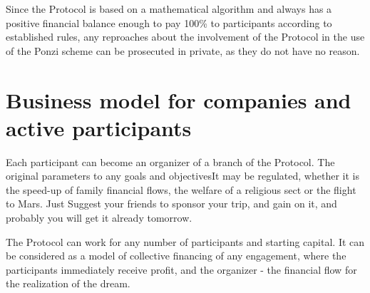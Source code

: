 Since the Protocol is based on a mathematical algorithm and always has a positive financial balance enough to pay 100\% to participants according to established rules, any reproaches about the involvement of the Protocol in the use of the Ponzi scheme can be prosecuted in private, as they do not have no reason.

\section*{Business model for companies and active participants}

Each participant can become an organizer of a branch of the Protocol. The original parameters to any goals and objectives\+It may be regulated, whether it is the speed-\/up of family financial flows, the welfare of a religious sect or the flight to Mars. Just Suggest your friends to sponsor your trip, and gain on it, and probably you will get it already tomorrow.

The Protocol can work for any number of participants and starting capital. It can be considered as a model of collective financing of any engagement, where the participants immediately receive profit, and the organizer -\/ the financial flow for the realization of the dream. 
